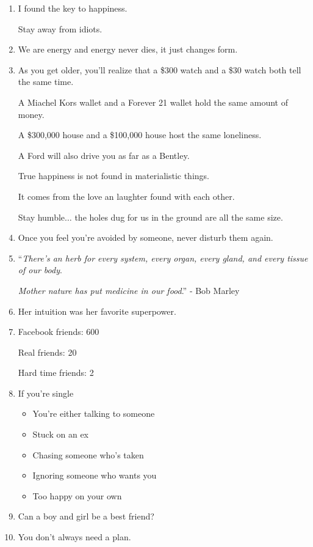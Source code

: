 \documentclass{article}
\numberwithin{equation}{section}
\begin{document}
\begin{enumerate}
    She won't fix it or beg, she'll just walk away.
    \item I found the key to happiness.
    
    Stay away from idiots.
    \item We are energy and energy never dies, it just changes form.
    \item As you get older, you'll realize that a \$300 watch and a \$30 watch both tell the same time.
    
    A Miachel Kors wallet and a Forever 21 wallet hold the same amount of money.
    
    A \$300,000 house and a \$100,000 house host the same loneliness.
    
    A Ford will also drive you as far as a Bentley.
    
    True happiness is not found in materialistic things.
    
    It comes from the love an laughter found with each other.
    
    Stay humble$\ldots$ the holes dug for us in the ground are all the same size.
    \item Once you feel you're avoided by someone, never disturb them again.
    \item ``\textit{There's an herb for every system, every organ, every gland, and every tissue of our body}.
    
    \textit{Mother nature has put medicine in our food}.'' - Bob Marley
    \item Her intuition was her favorite superpower.
    \item Facebook friends: 600
    
    Real friends: 20
    
    Hard time friends: 2
    \item If you're single
    \begin{itemize}
        \item[1.] You're either talking to someone
        \item[2.] Stuck on an ex
        \item[3.] Chasing someone who's taken
        \item[4.] Ignoring someone who wants you
        \item[5.] Too happy on your own
    \end{itemize}
    \item Can a boy and girl be a best friend?
    \item You don't always need a plan.
    

\end{enumerate}
\end{document}

